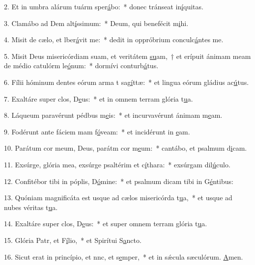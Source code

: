 2. Et in umbra alárum tuárm sper\uline{á}bo:~* donec tránseat in\uline{í}quitas.\par 
3. Clamábo ad Dem alt\uline{í}ssimum:~* Deum, qui benefécit m\uline{i}hi.\par 
4. Misit de cælo, et lber\uline{á}vit me:~* dedit in oppróbrium conculc\uline{á}ntes me.\par 
5. Misit Deus misericórdiam suam, et veritátem \uline{su}am,~† et erípuit ánimam meam de médio catulórm le\uline{ó}num:~* dormívi conturb\uline{á}tus.\par 
6. Fílii hóminum dentes eórum arma t sag\uline{í}ttæ:~* et lingua eórum gládius ac\uline{ú}tus.\par 
7. Exaltáre super clos, D\uline{e}us:~* et in omnem terram glória t\uline{u}a.\par 
8. Láqueum paravérunt pédbus m\uline{e}is:~* et incurvavérunt ánimam m\uline{e}am.\par 
9. Fodérunt ante fáciem mam f\uline{ó}veam:~* et incidérunt in \uline{e}am.\par 
10. Parátum cor meum, Deus, parátm cor m\uline{e}um:~* cantábo, et psalmum d\uline{i}cam.\par 
11. Exsúrge, glória mea, exsúrge psaltérim et c\uline{í}thara:~* exsúrgam dil\uline{ú}culo.\par 
12. Confitébor tibi in póplis, D\uline{ó}mine:~* et psalmum dicam tibi in G\uline{é}ntibus:\par 
13. Quóniam magnificáta est usque ad cælos misericórda t\uline{u}a,~* et usque ad nubes véritas t\uline{u}a.\par 
14. Exaltáre super clos, D\uline{e}us:~* et super omnem terram glória t\uline{u}a.\par 
15. Glória Patr, et F\uline{í}lio,~* et Spirítui S\uline{a}ncto.\par 
16. Sicut erat in princípio, et nnc, et s\uline{e}mper,~* et in sǽcula sæculórum. \uline{A}men.\par 
